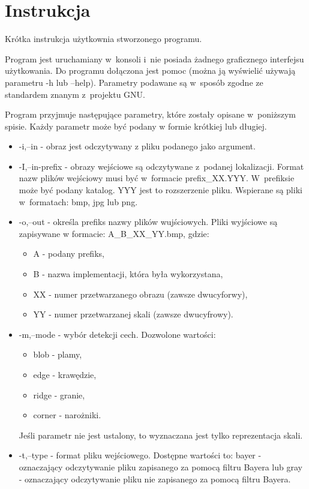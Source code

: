 \chapter{Instrukcja}
\label{cha:instrukcja}

Krótka instrukcja użytkownia stworzonego programu.

Program jest uruchamiany w~konsoli i~nie posiada żadnego graficznego interfejsu użytkowania. Do programu dołączona jest pomoc (można ją wyświelić używają parametru -h lub --help). Parametry podawane są w~sposób zgodne ze standardem znanym z~projektu GNU.

Program przyjmuje następujące parametry, które zostały opisane w~poniższym spisie. Każdy parametr może być podany w formie krótkiej lub długiej.

\begin{itemize}
\item -i,--in - obraz jest odczytywany z pliku podanego jako argument.
\item -I,--in-prefix - obrazy wejściowe są odczytywane z~podanej lokalizacji. Format nazw plików wejściowy musi być w~formacie prefix\_XX.YYY. W~prefiksie może być podany katalog. YYY jest to rozszerzenie pliku. Wspierane są pliki w~formatach: bmp, jpg lub png.
\item -o,--out - określa prefiks nazwy plików wujściowych. Pliki wyjściowe są zapisywane w formacie: A\_B\_XX\_YY.bmp, gdzie:
	\begin{itemize}
		\item A - podany prefiks,
		\item B - nazwa implementacji, która była wykorzystana,
		\item XX - numer przetwarzanego obrazu (zawsze dwucyforwy),
		\item YY - numer przetwarzanej skali (zawsze dwucyfrowy).
	\end{itemize}
\item -m,--mode - wybór detekcji cech. Dozwolone wartości:
	\begin{itemize}
		\item blob - plamy,
		\item edge - krawędzie,
		\item ridge - granie,
		\item corner - narożniki.
	\end{itemize}
	Jeśli parametr nie jest ustalony, to wyznaczana jest tylko reprezentacja skali.
\item -t,--type - format pliku wejściowego. Dostępne wartości to: bayer - oznaczający odczytywanie pliku zapisanego za pomocą filtru Bayera lub gray - oznaczający odczytywanie pliku nie zapisanego za pomocą filtru Bayera.

\end{itemize}
